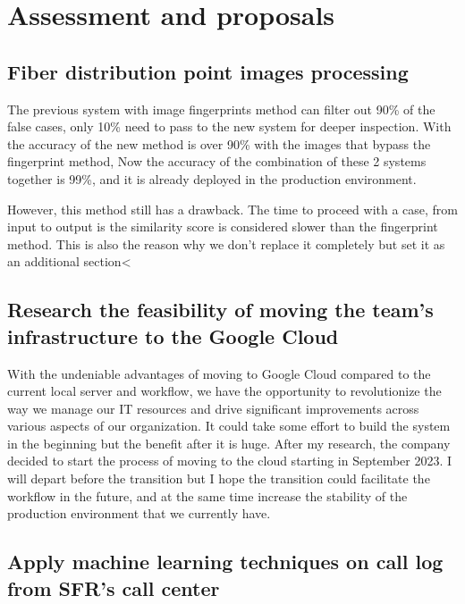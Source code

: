 \chapter{Assessment and proposals}

\startcontents[chapters]
\printmyminitoc{
}

\section{Fiber distribution point images processing}

The previous system with image fingerprints method can filter out 90\% of the false cases, only 10\% need to pass to the new system for deeper inspection. With the accuracy of the new method is over 90\% with the images that bypass the fingerprint method, Now the accuracy of the combination of these 2 systems together is 99\%, and it is already deployed in the production environment. 

However, this method still has a drawback. The time to proceed with a case, from input to output is the similarity score is considered slower than the fingerprint method. This is also the reason why we don't replace it completely but set it as an additional section<

\section{Research the feasibility of moving the team's infrastructure to the Google Cloud}

With the undeniable advantages of moving to Google Cloud compared to the current local server and workflow, we have the opportunity to revolutionize the way we manage our IT resources and drive significant improvements across various aspects of our organization. It could take some effort to build the system in the beginning but the benefit after it is huge. After my research, the company decided to start the process of moving to the cloud starting in September 2023. I will depart before the transition but I hope the transition could facilitate the workflow in the future, and at the same time increase the stability of the production environment that we currently have.

\section{Apply machine learning techniques on call log from SFR's call center}

